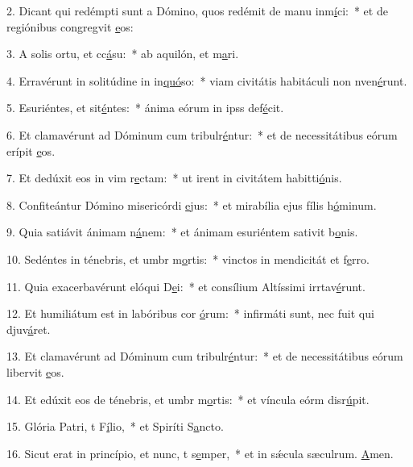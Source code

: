 2. Dicant qui redémpti sunt a Dómino, quos redémit de manu inm\uline{í}ci:~* et de regiónibus congregvit \uline{e}os:\par 
3. A solis ortu, et cc\uline{á}su:~* ab aquilón, et m\uline{a}ri.\par 
4. Erravérunt in solitúdine in in\uline{quó}so:~* viam civitátis habitáculi non nven\uline{é}runt.\par 
5. Esuriéntes, et sit\uline{é}ntes:~* ánima eórum in ipss def\uline{é}cit.\par 
6. Et clamavérunt ad Dóminum cum tribulr\uline{é}ntur:~* et de necessitátibus eórum erípit \uline{e}os.\par 
7. Et dedúxit eos in vim r\uline{e}ctam:~* ut irent in civitátem habitti\uline{ó}nis.\par 
8. Confiteántur Dómino misericórdi \uline{e}jus:~* et mirabília ejus fílis h\uline{ó}minum.\par 
9. Quia satiávit ánimam n\uline{á}nem:~* et ánimam esuriéntem sativit b\uline{o}nis.\par 
10. Sedéntes in ténebris, et umbr m\uline{o}rtis:~* vinctos in mendicitát et f\uline{e}rro.\par 
11. Quia exacerbavérunt elóqui D\uline{e}i:~* et consílium Altíssimi irrtav\uline{é}runt.\par 
12. Et humiliátum est in labóribus cor \uline{ó}rum:~* infirmáti sunt, nec fuit qui djuv\uline{á}ret.\par 
13. Et clamavérunt ad Dóminum cum tribulr\uline{é}ntur:~* et de necessitátibus eórum libervit \uline{e}os.\par 
14. Et edúxit eos de ténebris, et umbr m\uline{o}rtis:~* et víncula eórm disr\uline{ú}pit.\par 
15. Glória Patri, t F\uline{í}lio,~* et Spiríti S\uline{a}ncto.\par 
16. Sicut erat in princípio, et nunc, t s\uline{e}mper,~* et in sǽcula sæculrum. \uline{A}men.\par 
